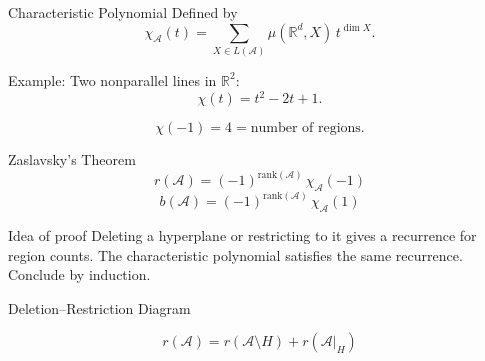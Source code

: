 \documentclass{beamer}
\begin{document}
\begin{frame}{Characteristic Polynomial}
Defined by
\[
\chi_{\mathcal{A}}(t)=
\sum_{X\in L(\mathcal{A})} \mu(\mathbb{R}^d,X)\, t^{\dim X}.
\]

\pause

Example: Two nonparallel lines in $\mathbb{R}^2$:
\[
\chi(t) = t^2 - 2t +1.
\]

\pause

\[
\chi(-1) = 4 = \text{number of regions.}
\]
\end{frame}

\begin{frame}{Zaslavsky's Theorem}
\[
r(\mathcal{A}) = (-1)^{\text{rank}(\mathcal A)}\, \chi_{\mathcal{A}}(-1)
\]
\[
b(\mathcal{A}) = (-1)^{\text{rank}(\mathcal A)}\, \chi_{\mathcal{A}}(1)
\]

\pause

\begin{block}{Idea of proof}
Deleting a hyperplane or restricting to it gives a recurrence for region counts.
The characteristic polynomial satisfies the same recurrence.  
Conclude by induction.
\end{block}
\end{frame}

\begin{frame}{Deletion--Restriction Diagram}
\begin{center}
\end{center}

\[
r(\mathcal{A}) = r(\mathcal{A}\setminus H) + r(\mathcal{A}|_H)
\]
\end{frame}
\end{document}
